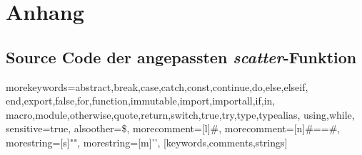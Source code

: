 \chapter{Anhang}

\section{Source Code der angepassten \textit{scatter}-Funktion}

%
  {morekeywords={abstract,break,case,catch,const,continue,do,else,elseif,%
      end,export,false,for,function,immutable,import,importall,if,in,%
      macro,module,otherwise,quote,return,switch,true,try,type,typealias,%
      using,while},%
   sensitive=true,%
   alsoother={\$},%
   morecomment=[l]#,%
   morecomment=[n]{#=}{=#},%
   morestring=[s]{"}{"},%
   morestring=[m]{'}{'},%
}[keywords,comments,strings]%


